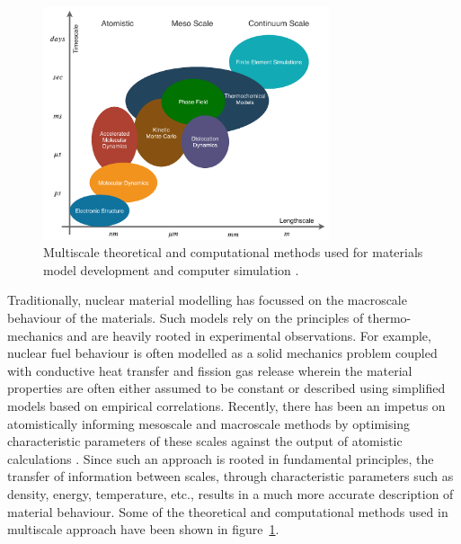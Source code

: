 	\begin{figure}[htbp]
		\centering
		\includegraphics[width=0.75\textwidth]{figures/chapter-1/Multiphysics.pdf}
		\caption[Multiscale methods used for materials modelling simulation]{Multiscale theoretical and computational methods used for materials model development and computer simulation \cite{STAN200920}.}
		\label{fig:multiphys}
	\end{figure}

	Traditionally, nuclear material modelling has focussed on the macroscale behaviour of the materials. Such models rely on the principles of thermo-mechanics and are heavily rooted in experimental observations. For example, nuclear fuel behaviour is often modelled as a solid mechanics problem coupled with conductive heat transfer and fission gas release wherein the material properties are often either assumed to be constant or described using simplified models based on empirical correlations. Recently, there has been an impetus on atomistically informing mesoscale  and macroscale methods by optimising characteristic parameters of these scales against the output of atomistic calculations \cite{STAN200920}. Since such an approach is rooted in fundamental principles, the transfer of information between scales, through characteristic parameters such as density, energy, temperature, etc., results in a much more accurate description of material behaviour. Some of the theoretical and computational methods used in multiscale approach have been shown in figure~\ref{fig:multiphys}.

